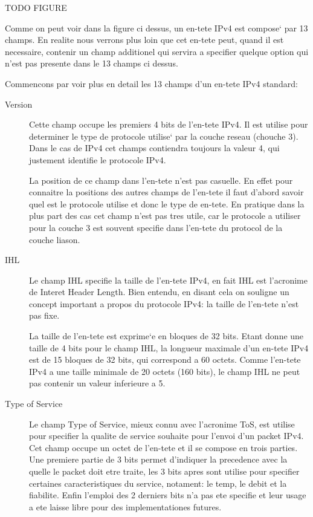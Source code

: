 \documentclass[twoside,openright,a4paper,11pt,french]{article}
\begin{document}
TODO FIGURE


Comme on peut voir dans la figure ci dessus, un en-tete IPv4 est compose` par
13 champs. En realite nous verrons plus loin que cet en-tete peut, quand il est
necessaire, contenir un champ additionel qui servira a specifier quelque
option qui n'est pas presente dans le 13 champs ci dessus.


Commencons par voir plus en detail les 13 champs d'un en-tete IPv4 standard:

\begin{description}
\item [Version] 
Cette champ occupe les premiers 4 bits de l'en-tete IPv4. Il est
utilise pour determiner le type de protocole utilise` par la couche
reseau (chouche 3). Dans le cas de IPv4 cet champs contiendra toujours
la valeur 4, qui justement identifie le protocole IPv4.

La position de ce champ dans l'en-tete n'est pas casuelle. En effet pour
connaitre la positions des autres champs de l'en-tete il faut d'abord savoir
quel est le protocole utilise et donc le type de en-tete.
En pratique dans la plus part des cas cet champ n'est pas tres utile, car le
protocole a utiliser pour la couche 3 est souvent specifie dans l'en-tete du
protocol de la couche liason.

\item [IHL]
Le champ IHL specifie la taille de l'en-tete IPv4, en fait IHL est 
l'acronime de Interet Header Length. Bien entendu, en disant cela on souligne
un concept important a propos du protocole IPv4: la taille de l'en-tete n'est pas fixe.

La taille de l'en-tete est exprime`e en bloques de 32 bits. Etant donne une taille de
4 bits pour le champ IHL, la longueur maximale d'un en-tete IPv4 est de 15 bloques de
32 bits, qui correspond a 60 octets. Comme l'en-tete IPv4 a une taille minimale
de 20 octets (160 bits), le champ IHL ne peut pas contenir un valeur inferieure a 5.

\item [Type of Service]
Le champ Type of Service, mieux connu avec l'acronime ToS, est utilise pour 
specifier la qualite de service souhaite pour l'envoi d'un packet IPv4.
Cet champ occupe un octet de l'en-tete et il se compose en trois parties.
Une premiere partie de 3 bits permet d'indiquer la precedence avec la quelle
le packet doit etre traite, les 3 bits apres sont utilise pour specifier 
certaines caracteristiques du service, notament: le temp, le debit et la fiabilite.
Enfin l'emploi des 2 derniers bits n'a pas ete specifie et leur usage a ete 
laisse libre pour des implementationes futures.



\end{description}
\end{document}

